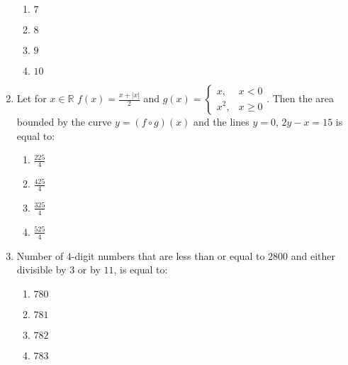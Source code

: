 \documentclass[journal]{IEEEtran}
\newcommand{\brak}[1]{\left( #1 \right)}
\newcommand{\abs}[1]{\left| #1 \right|}
\newcommand{\lt}{<}
\begin{document}
\begin{enumerate}
        \begin{multicols}{4}
        \begin{enumerate}
        \item $7$
        \item $8$
        \item $9$
        \item $10$
        \end{enumerate}
        \end{multicols}

    \item Let for $x\in\mathbb{R}$
     $f\brak{x}=\frac{x+\abs{x}}{2}$
     and $g\brak{x}=
     \begin{cases}
     x, & x\lt0 \\
     x^{2}, & x\geq0
     \end{cases}$.
     Then the area bounded by the curve $y=\brak{f\circ g}\brak{x}$ and the lines $y=0$, $2y-x=15$ is equal to:
    
        \begin{multicols}{4}
        \begin{enumerate}
        \item $\frac{225}{4}$
        \item $\frac{425}{4}$
        \item $\frac{325}{4}$
        \item $\frac{525}{4}$
        \end{enumerate}
        \end{multicols}

    \item Number of $4$-digit numbers that are less than or equal to $2800$ and either divisible by $3$ or by $11$, is equal to:

        \begin{multicols}{4}
        \begin{enumerate}
        \item $780$
        \item $781$
        \item $782$
        \item $783$
        \end{enumerate}
        \end{multicols}
    
\end{enumerate}
        
\end{document}
